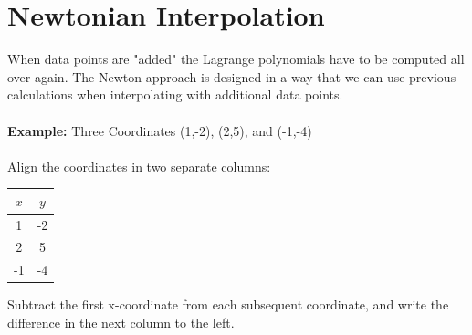 \documentclass[a4paper,12pt]{report}
\begin{document}
\section{Newtonian Interpolation}
	When data points are "added" the Lagrange polynomials have to be computed all over again. The Newton approach
	is designed in a way that we can use previous calculations when interpolating with additional data points.\\ \\

	\noindent \textbf{Example:} Three Coordinates (1,-2), (2,5), and (-1,-4)\\ \\

	\noindent Align the coordinates in two separate columns:

\begin{center}
	\begin{tabular}{cc}
	$x$ & $y$\\
	\hline
	1 & -2\\
	2 & 5 \\
	-1&-4
	\end{tabular}
\end{center}

	\noindent Subtract the first x-coordinate from each subsequent coordinate, and write the difference in the next column to the left.
	\vspace {-0.4cm}

\begin{center}
\end{center}
	
\end{document}
